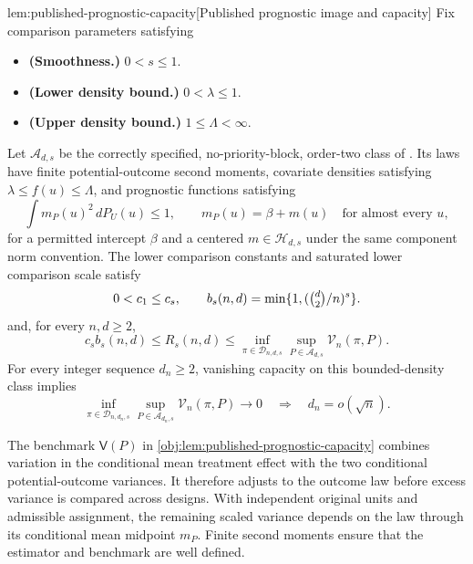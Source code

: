\begin{lemmav}{lem:published-prognostic-capacity}[Published prognostic image and capacity]
Fix comparison parameters satisfying
\begin{itemize}
\item \textbf{(Smoothness.)} \(0<s\leq1\).
\item \textbf{(Lower density bound.)} \(0<\lambda\leq1\).
\item \textbf{(Upper density bound.)} \(1\leq\Lambda<\infty\).
\end{itemize}
Let \(\mathcal A_{d,s}\) be the correctly specified, no-priority-block, order-two class of \citet[Theorem B.8(ii)]{Cytrynbaum2026Limits}. Its laws have finite potential-outcome second moments, covariate densities satisfying \(\lambda\leq f(u)\leq\Lambda\), and prognostic functions satisfying
\[
\int m_P(u)^2\,dP_U(u)\leq1,
\qquad
m_P(u)=\beta+m(u)\quad\text{for almost every }u,
\]
for a permitted intercept \(\beta\) and a centered \(m\in\mathcal H_{d,s}\) under the same component norm convention. The lower comparison constants and saturated lower comparison scale satisfy
\[
0<c_1\leq c_s,
\qquad
b_s(n,d)=\min\{1,(\tbinom d2/n)^s\}.
\]
and, for every \(n,d\geq2\),
\[
c_s b_s(n,d)
\leq R_s(n,d)
\leq
\inf_{\pi\in\mathcal D_{n,d,s}}
\sup_{P\in\mathcal A_{d,s}}\mathcal V_n(\pi,P).
\]
For every integer sequence \(d_n\geq2\), vanishing capacity on this bounded-density class implies
\[
\inf_{\pi\in\mathcal D_{n,d_n,s}}
\sup_{P\in\mathcal A_{d_n,s}}\mathcal V_n(\pi,P)
\longrightarrow0
\quad\Longrightarrow\quad
d_n=o(\sqrt n).
\]
\end{lemmav}

The benchmark \(\mathsf V(P)\) in \cref{obj:lem:published-prognostic-capacity} combines variation in the conditional mean treatment effect with the two conditional potential-outcome variances. It therefore adjusts to the outcome law before excess variance is compared across designs. With independent original units and admissible assignment, the remaining scaled variance depends on the law through its conditional mean midpoint \(m_P\). Finite second moments ensure that the estimator and benchmark are well defined.

